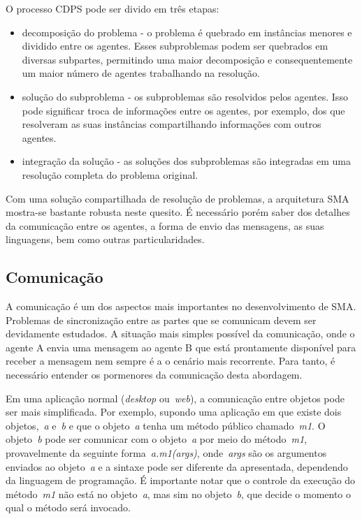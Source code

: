 O processo CDPS pode ser divido em três etapas:
\begin{itemize}
	\item decomposição do problema - o problema é quebrado em instâncias menores e dividido entre os agentes. Esses subproblemas podem ser quebrados em diversas subpartes, permitindo uma maior decomposição e consequentemente um maior número de agentes trabalhando na resolução.
	\item solução do subproblema - os subproblemas são resolvidos pelos agentes. Isso pode significar troca de informações entre os agentes, por exemplo, dos que resolveram as suas instâncias compartilhando informações com outros agentes.
	\item integração da solução - as soluções dos subproblemas são integradas em uma resolução completa do problema original.
\end{itemize}

Com uma solução compartilhada de resolução de problemas, a arquitetura SMA mostra-se bastante robusta neste quesito. É necessário porém saber dos detalhes da comunicação entre os agentes, a forma de envio das mensagens, as suas linguagens, bem como outras particularidades.

\subsection{Comunicação}

A comunicação é um dos aspectos mais importantes no desenvolvimento de SMA. Problemas de sincronização entre as partes que se comunicam devem ser devidamente estudados. A situação mais simples possível da comunicação, onde o agente A envia uma mensagem ao agente B que está prontamente disponível para receber a mensagem nem sempre é a o cenário mais recorrente. Para tanto, é necessário entender os pormenores da comunicação desta abordagem.

Em uma aplicação normal (\emph{desktop} ou~\emph{web}), a comunicação entre objetos pode ser mais simplificada. Por exemplo, supondo uma aplicação em que existe dois objetos,~\emph{a} e~\emph{b} e que o objeto~\emph{a} tenha um método público chamado~\emph{m1}. O objeto~\emph{b} pode ser comunicar com o objeto~\emph{a} por meio do método~\emph{m1}, provavelmente da seguinte forma~\emph{a.m1(args)}, onde~\emph{args} são os argumentos enviados ao objeto~\emph{a} e a sintaxe pode ser diferente da apresentada, dependendo da linguagem de programação. É importante notar que o controle da execução do método~\emph{m1} não está no objeto~\emph{a}, mas sim no objeto~\emph{b}, que decide o momento o qual o método será invocado.

